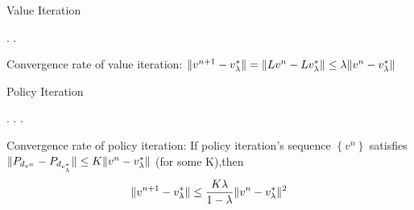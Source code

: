 \documentclass{beamer}
\begin{document}
\begin{frame}[t]{Value Iteration}
    \begin{algorithm}[H]
        \caption{Value Iteration Algorithm}
        \begin{algorithmic}
                \EndIf.
            \EndFor.
            \State{}
        \end{algorithmic}
    \end{algorithm}
    Convergence rate of value iteration:
    $ \Arrowvert v^{n+1} - v^*_\lambda \Arrowvert = \Arrowvert Lv^n - Lv^*_\lambda \Arrowvert \le \lambda \Arrowvert v^n - v^*_\lambda \Arrowvert $
\end{frame}

\begin{frame}[t]{Policy Iteration}
    \begin{algorithm}[H]
    \caption{Policy Iteration Algorithm}
    \begin{algorithmic}
        .
            \EndIf.
        \EndFor.
    \end{algorithmic}
    \end{algorithm}
    Convergence rate of policy iteration:
    If policy iteration's sequence $ \left\{ v^n \right\} $ satisfies                                                         
    $ \Arrowvert P_{d_{v^n}} - P_{d_{v^*_{\lambda}}} \Arrowvert \le K \Arrowvert v^n - v^*_\lambda \Arrowvert $ (for some K),then
    \[
        \Arrowvert v^{n+1} - v^*_{\lambda} \Arrowvert \le \frac{K\lambda}{1-\lambda} \Arrowvert v^n - v^*_\lambda \Arrowvert^2
    \]
\end{frame}
\end{document}
